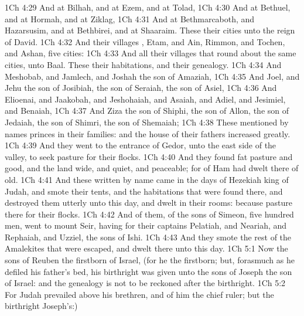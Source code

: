 \vs 1Ch 4:29 And at Bilhah, and at Ezem, and at Tolad,
\vs 1Ch 4:30 And at Bethuel, and at Hormah, and at Ziklag,
\vs 1Ch 4:31 And at Bethmarcaboth, and Hazarsusim, and at Bethbirei, and at Shaaraim. These  their cities unto the reign of David.
\vs 1Ch 4:32 And their villages , Etam, and Ain, Rimmon, and Tochen, and Ashan, five cities:
\vs 1Ch 4:33 And all their villages that  round about the same cities, unto Baal. These  their habitations, and their genealogy.
\vs 1Ch 4:34 And Meshobab, and Jamlech, and Joshah the son of Amaziah,
\vs 1Ch 4:35 And Joel, and Jehu the son of Josibiah, the son of Seraiah, the son of Asiel,
\vs 1Ch 4:36 And Elioenai, and Jaakobah, and Jeshohaiah, and Asaiah, and Adiel, and Jesimiel, and Benaiah,
\vs 1Ch 4:37 And Ziza the son of Shiphi, the son of Allon, the son of Jedaiah, the son of Shimri, the son of Shemaiah;
\vs 1Ch 4:38 These mentioned by  names  princes in their families: and the house of their fathers increased greatly.
\vs 1Ch 4:39 And they went to the entrance of Gedor,  unto the east side of the valley, to seek pasture for their flocks.
\vs 1Ch 4:40 And they found fat pasture and good, and the land  wide, and quiet, and peaceable; for  of Ham had dwelt there of old.
\vs 1Ch 4:41 And these written by name came in the days of Hezekiah king of Judah, and smote their tents, and the habitations that were found there, and destroyed them utterly unto this day, and dwelt in their rooms: because  pasture there for their flocks.
\vs 1Ch 4:42 And  of them,  of the sons of Simeon, five hundred men, went to mount Seir, having for their captains Pelatiah, and Neariah, and Rephaiah, and Uzziel, the sons of Ishi.
\vs 1Ch 4:43 And they smote the rest of the Amalekites that were escaped, and dwelt there unto this day.
\vs 1Ch 5:1 Now the sons of Reuben the firstborn of Israel, (for he  the firstborn; but, forasmuch as he defiled his father's bed, his birthright was given unto the sons of Joseph the son of Israel: and the genealogy is not to be reckoned after the birthright.
\vs 1Ch 5:2 For Judah prevailed above his brethren, and of him  the chief ruler; but the birthright  Joseph's:)
